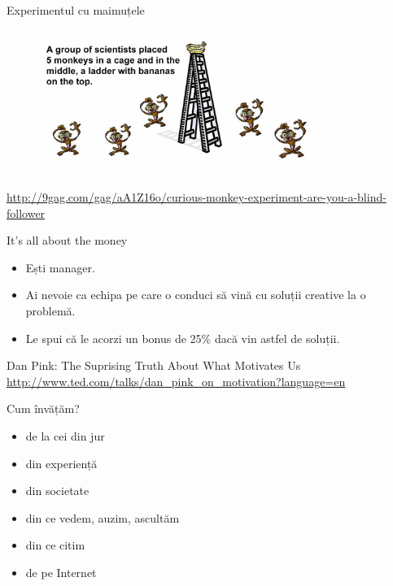 \documentclass{beamer}
\begin{document}
\begin{frame}{Experimentul cu maimuțele}
  \begin{figure}
    \centering
    \includegraphics[width=0.8\textwidth]{img/monkey-experiment}
  \end{figure}
  \begin{center}
    \tiny
    \url{http://9gag.com/gag/aA1Z16o/curious-monkey-experiment-are-you-a-blind-follower}
  \end{center}
\end{frame}

\begin{frame}{It's all about the money}
  \begin{itemize}
    \pause \item Ești manager.
    \pause \item Ai nevoie ca echipa pe care o conduci să vină cu soluții creative la o problemă.
    \pause \item Le spui că le acorzi un bonus de 25\% dacă vin astfel de soluții.
  \end{itemize}
  \pause
  \begin{center}
    Dan Pink: The Suprising Truth About What Motivates Us\\
    \vspace{3mm}
    \scriptsize
    \url{http://www.ted.com/talks/dan_pink_on_motivation?language=en}
  \end{center}
\end{frame}

\begin{frame}{Cum învățăm?}
  \begin{itemize}
    \pause \item de la cei din jur
    \pause \item din experiență
    \pause \item din societate
    \pause \item din ce vedem, auzim, ascultăm
    \pause \item din ce citim
    \pause \item de pe Internet
  \end{itemize}
\end{frame}
\end{document}
